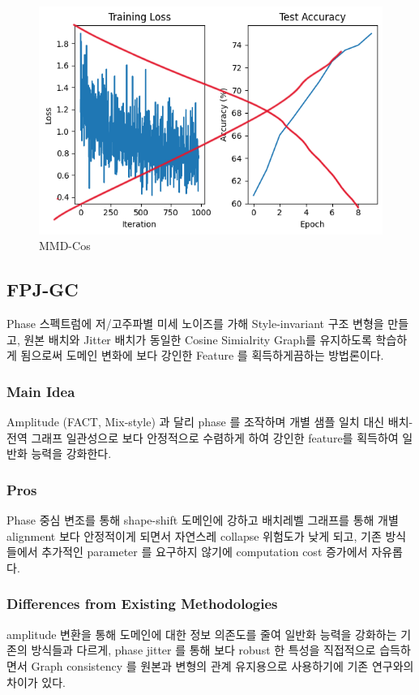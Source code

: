 \begin{figure}[h]
  \centering
  \includegraphics[width=\linewidth]{images/temp.png}
  \caption{MMD-Cos}
  \label{fig:MMD-Cos1}
\end{figure}

\subsection{FPJ-GC}
Phase 스펙트럼에 저/고주파별 미세 노이즈를 가해 Style-invariant 구조 
변형을 만들고, 원본 배치와 Jitter 배치가 동일한 Cosine Simialrity Graph를 
유지하도록 학습하게 됨으로써 도메인 변화에 보다 강인한 Feature 를 획득하게끔하는 방법론이다.

\subsubsection{Main Idea}
Amplitude (FACT, Mix-style) 과 달리 phase 를 조작하며 개별 샘플 일치 대신 
배치-전역 그래프 일관성으로 보다 안정적으로 수렴하게 하여 강인한 feature를 획득하여 
일반화 능력을 강화한다.

\subsubsection{Pros}
Phase 중심 변조를 통해 shape-shift 도메인에 강하고 배치레벨 그래프를 통해 개별 
alignment 보다 안정적이게 되면서 자연스레 collapse 위험도가 낮게 되고, 기존 방식들에서 
추가적인 parameter 를 요구하지 않기에 computation cost 증가에서 자유롭다.

\subsubsection{Differences from Existing Methodologies}
amplitude 변환을 통해 도메인에 대한 정보 의존도를 줄여 일반화 능력을 강화하는 기존의 
방식들과 다르게, phase jitter 를 통해 보다 robust 한 특성을 직접적으로 습득하면서 
Graph consistency 를 원본과 변형의 관계 유지용으로 사용하기에 기존 연구와의 차이가 있다.

